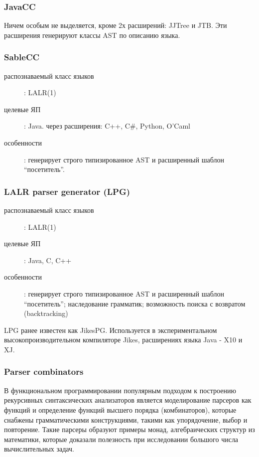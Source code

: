 \documentclass[a4paper,12pt]{article}
\begin{document}
\subsubsection*{JavaCC}
Ничем особым не выделяется, кроме 2х расширений: JJTree
и JTB. Эти расширения генерируют классы AST по описанию языка.

\subsubsection*{SableCC}
\begin{description}
  \item[распознаваемый класс языков]: LALR(1)
  \item[целевые ЯП]: Java. через расширения: C++, C\#, Python, O'Caml
  \item[особенности]: генерирует строго типизированное AST и расширенный
 	шаблон ``посетитель''.
\end{description}

\subsubsection*{LALR parser generator (LPG)}
\begin{description}
  \item[распознаваемый класс языков]: LALR(1)
  \item[целевые ЯП]: Java, C, C++
  \item[особенности]: генерирует строго типизированное AST и расширенный
 	шаблон ``посетитель''; наследование грамматик; возможность поиска с возвратом
 	(backtracking)
\end{description}

LPG ранее известен как JikesPG. Используется в экспериментальном
высокопроизводительном компиляторе Jikes, расширениях языка Java - X10 и XJ.

\subsubsection*{Parser combinators}
В функциональном программировании популярным подходом к построению рекурсивных
синтаксических анализаторов является моделирование парсеров как функций и
определение функций высшего порядка (комбинаторов), которые снабжены
грамматическими конструкциями, такими как упорядочение, выбор и повторение.
Такие парсеры образуют примеры монад, алгебраических структур из математики,
которые доказали полезность при исследовании большого числа вычислительных
задач.
\end{document}

